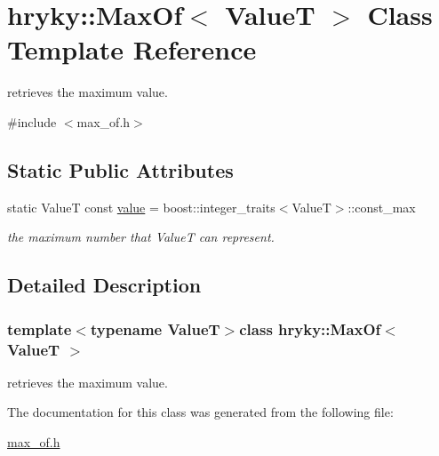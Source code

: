 \hypertarget{classhryky_1_1_max_of}{\section{hryky\-:\-:Max\-Of$<$ Value\-T $>$ Class Template Reference}
\label{classhryky_1_1_max_of}
}


retrieves the maximum value.  




{\ttfamily \#include $<$max\-\_\-of.\-h$>$}

\subsection*{Static Public Attributes}
\begin{DoxyCompactItemize}
\item 
\hypertarget{classhryky_1_1_max_of_ac1b33ef8eabaa778015f524edd8b9b1d}{static Value\-T const \hyperlink{classhryky_1_1_max_of_ac1b33ef8eabaa778015f524edd8b9b1d}{value} = boost\-::integer\-\_\-traits$<$Value\-T$>$\-::const\-\_\-max}\label{classhryky_1_1_max_of_ac1b33ef8eabaa778015f524edd8b9b1d}

\begin{DoxyCompactList}\small\item\em the maximum number that Value\-T can represent. \end{DoxyCompactList}\end{DoxyCompactItemize}


\subsection{Detailed Description}
\subsubsection*{template$<$typename Value\-T$>$class hryky\-::\-Max\-Of$<$ Value\-T $>$}

retrieves the maximum value. 

The documentation for this class was generated from the following file\-:\begin{DoxyCompactItemize}
\item 
\hyperlink{max__of_8h}{max\-\_\-of.\-h}\end{DoxyCompactItemize}
